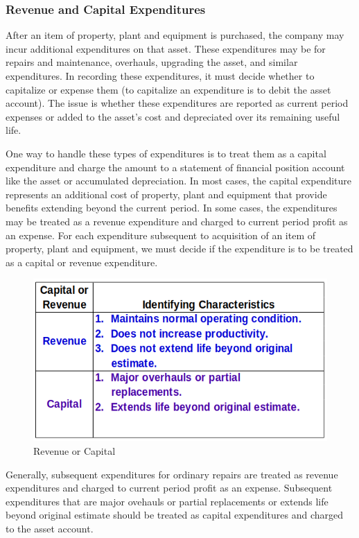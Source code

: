 \documentclass[../main.tex]{subfiles}
\begin{document}
	\subsubsection{Revenue and Capital Expenditures}
	
	After an item of property, plant and equipment is purchased, the company 
	may incur additional expenditures on that asset. These expenditures may be 
	for repairs and maintenance, overhauls, upgrading the asset, and similar 
	expenditures. In recording these expenditures, it must decide whether to 
	capitalize or expense them (to capitalize an expenditure is to debit the 
	asset account). The issue is whether these expenditures are reported as 
	current period expenses or added to the asset’s cost and depreciated over 
	its remaining useful life.
	
	One way to handle these types of expenditures is to treat them as a capital 
	expenditure and charge the amount to a statement of financial position 
	account like the asset or accumulated depreciation. In most cases, the 
	capital expenditure represents an additional cost of  property, plant and 
	equipment that provide benefits extending beyond the current period. In 
	some cases, the expenditures may be treated as a revenue expenditure and 
	charged to current period profit as an expense. For each expenditure 
	subsequent to acquisition of an item of property, plant and equipment, we 
	must decide if the expenditure is to be treated as a capital or revenue 
	expenditure.
	
	
	\begin{figure}[ht]
		\centering
		\includegraphics[width=.8\columnwidth]{images/c8/revenue_or_capital.png}
		\caption{Revenue or Capital}
	\end{figure}
	
	Generally, subsequent expenditures for ordinary repairs are treated as 
	revenue expenditures and charged to current period profit as an expense. 
	Subsequent expenditures that are major ovehauls or partial replacements or 
	extends life beyond original estimate should be treated as capital 
	expenditures and charged to the asset account.
	
\end{document}
